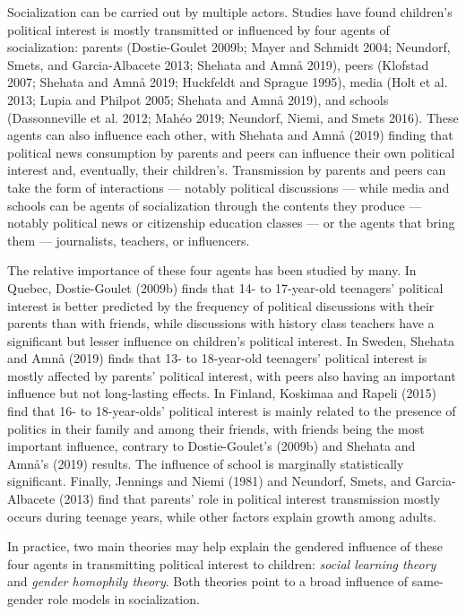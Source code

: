 \documentclass[
  letterpaper,
  DIV=11,
  numbers=noendperiod]{scrreprt}
\begin{document}
Socialization can be carried out by multiple actors. Studies have found
children's political interest is mostly transmitted or influenced by
four agents of socialization: parents (Dostie-Goulet 2009b; Mayer and
Schmidt 2004; Neundorf, Smets, and Garcia-Albacete 2013; Shehata and
Amnå 2019), peers (Klofstad 2007; Shehata and Amnå 2019; Huckfeldt and
Sprague 1995), media (Holt et al. 2013; Lupia and Philpot 2005; Shehata
and Amnå 2019), and schools (Dassonneville et al. 2012; Mahéo 2019;
Neundorf, Niemi, and Smets 2016). These agents can also influence each
other, with Shehata and Amnå (2019) finding that political news
consumption by parents and peers can influence their own political
interest and, eventually, their children's. Transmission by parents and
peers can take the form of interactions --- notably political
discussions --- while media and schools can be agents of socialization
through the contents they produce --- notably political news or
citizenship education classes --- or the agents that bring them ---
journalists, teachers, or influencers.

The relative importance of these four agents has been studied by many.
In Quebec, Dostie-Goulet (2009b) finds that 14- to 17-year-old
teenagers' political interest is better predicted by the frequency of
political discussions with their parents than with friends, while
discussions with history class teachers have a significant but lesser
influence on children's political interest. In Sweden, Shehata and Amnå
(2019) finds that 13- to 18-year-old teenagers' political interest is
mostly affected by parents' political interest, with peers also having
an important influence but not long-lasting effects. In Finland,
Koskimaa and Rapeli (2015) find that 16- to 18-year-olds' political
interest is mainly related to the presence of politics in their family
and among their friends, with friends being the most important
influence, contrary to Dostie-Goulet's (2009b) and Shehata and Amnå's
(2019) results. The influence of school is marginally statistically
significant. Finally, Jennings and Niemi (1981) and Neundorf, Smets, and
Garcia-Albacete (2013) find that parents' role in political interest
transmission mostly occurs during teenage years, while other factors
explain growth among adults.

In practice, two main theories may help explain the gendered influence
of these four agents in transmitting political interest to children:
\emph{social learning theory} and \emph{gender homophily theory}. Both
theories point to a broad influence of same-gender role models in
socialization.
\end{document}
